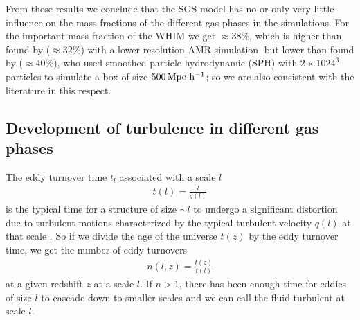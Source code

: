 From these results we conclude that the SGS model has no or only very little
influence on the mass fractions of the different gas phases in the simulations.
For the important mass fraction of the WHIM we get $ \approx 38\%$, which is 
higher than found by \citet[simulation B1]{Dave2001} ($ \approx 32\%$) with a
lower resolution AMR simulation, but lower than found by \citet{Gottlober2006}
($ \approx 40\%$), who used smoothed particle hydrodynamic (SPH) with 
$2 \times 1024^3$ particles to simulate a box of size $\unit[500]{Mpc\ h^{-1}}$;
so we are also consistent with the literature in this respect.

\subsection{Development of turbulence in different gas phases}
The eddy turnover time $t_l$ associated with a scale $l$ 
\begin{align}
t(l) = \frac{l}{q(l)}
\end{align}
is the typical time for a structure of size $\sim l$ to undergo a significant
distortion due to turbulent motions characterized by the
typical turbulent velocity $q(l)$ at that scale \citep{Frisch1995}. So if we
divide the age of the universe $t(z)$ by the eddy turnover time, we get the
number of eddy turnovers 
\begin{align}
n(l,z)=\frac{t(z)}{t(l)}
\end{align}
at a given redshift $z$ at a scale $l$. If $n > 1$, there has been enough time 
for eddies of size $l$ to cascade down to smaller scales and we can call the
fluid turbulent at scale $l$. 

